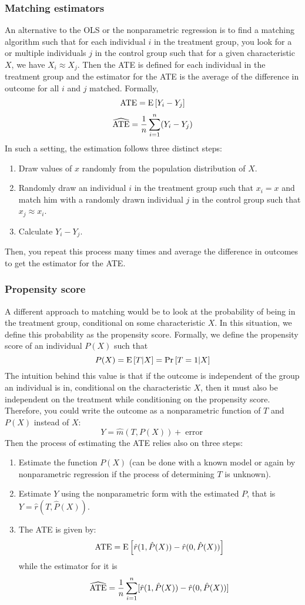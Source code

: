 \subsubsection{Matching estimators}

An alternative to the OLS or the nonparametric regression is to find a matching algorithm such that for each individual $i$ in the treatment group, you look for a or multiple individuals $j$ in the control group such that for a given characteristic $X$, we have $X_i\approx X_j$. Then the ATE is defined for each individual in the treatment group and the estimator for the ATE is the average of the difference in outcome for all $i$ and $j$ matched. Formally, $$\operatorname{ATE} = \operatorname{E}\left[Y_i - Y_j\right] $$ $$\widehat{\operatorname{ATE}} = \frac{1}{n} \sum_{i=1}^{n} (Y_i - Y_j) $$ In such a setting, the estimation follows three distinct steps:\begin{enumerate}
\item Draw values of $x$ randomly from the population distribution of $X$.
\item Randomly draw an individual $i$ in the treatment group such that $x_i = x$ and match him with a randomly drawn individual $j$ in the control group such that $x_j\approx x_i$.
\item Calculate $Y_i - Y_j$.
\end{enumerate} Then, you repeat this process many times and average the difference in outcomes to get the estimator for the ATE.

\subsubsection{Propensity score}

A different approach to matching would be to look at the probability of being in the treatment group, conditional on some characteristic $X$. In this situation, we define this probability as the propensity score. Formally, we define the propensity score of an individual $P(X)$ such that $$P(X) = \operatorname{E}\left[T\vert X\right] = \operatorname{Pr}\left[T = 1\vert X\right]$$ The intuition behind this value is that if the outcome is independent of the group an individual is in, conditional on the characteristic $X$, then it must also be independent on the treatment while conditioning on the propensity score. Therefore, you could write the outcome as a nonparametric function of $T$ and $P(X)$ instead of $X$: $$Y = \hat m(T, P(X)) + \operatorname{error}$$ Then the process of estimating the ATE relies also on three steps:\begin{enumerate}
\item Estimate the function $P(X)$ (can be done with a known model or again by nonparametric regression if the process of determining $T$ is unknown).
\item Estimate $Y$ using the nonparametric form with the estimated $P$, that is $Y = \hat r(T, \hat P(X))$.
\item The ATE is given by: $$\operatorname{ATE} = \operatorname{E}\left[\hat r(1, \hat P(X)) - \hat r(0, \hat P(X))\right] $$ while the estimator for it is $$\widehat{\operatorname{ATE}} = \frac{1}{n} \sum_{i=1}^{n}[\hat r(1, \hat P(X)) - \hat r(0, \hat P(X))] $$
\end{enumerate}


